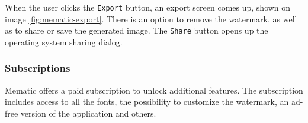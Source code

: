 When the user clicks the \texttt{Export} button, an export screen comes up, shown on image \ref{fig:mematic-export}. There is an option to remove the watermark, as well as to share or save the generated image. The \texttt{Share} button opens up the operating system sharing dialog.

\subsubsection{Subscriptions}
\label{sec:mematic-subscription}

Mematic offers a paid subscription to unlock additional features. The subscription includes access to all the fonts, the possibility to customize the watermark, an ad-free version of the application and others.

\begin{figure}
    \centering
    \begin{subfigure}{0.3\textwidth}
        \centering

\end{subfigure}
\end{figure}
